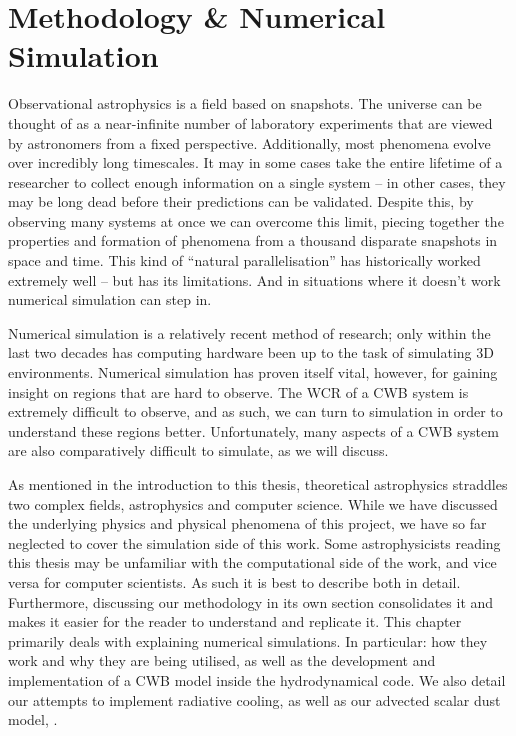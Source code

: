 \chapter{Methodology \& Numerical Simulation}
\label{ch:numsim}

Observational astrophysics is a field based on snapshots.
The universe can be thought of as a near-infinite number of laboratory experiments that are viewed by astronomers from a fixed perspective.
Additionally, most phenomena evolve over incredibly long timescales.
It may in some cases take the entire lifetime of a researcher to collect enough information on a single system -- in other cases, they may be long dead before their predictions can be validated.
Despite this, by observing many systems at once we can overcome this limit, piecing together the properties and formation of phenomena from a thousand disparate snapshots in space and time.
This kind of ``natural parallelisation'' has historically worked extremely well -- but has its limitations.
And in situations where it doesn't work numerical simulation can step in.

Numerical simulation is a relatively recent method of research; only within the last two decades has computing hardware been up to the task of simulating 3D environments.
Numerical simulation has proven itself vital, however, for gaining insight on regions that are hard to observe.
The WCR of a CWB system is extremely difficult to observe, and as such, we can turn to simulation in order to understand these regions better.
Unfortunately, many aspects of a CWB system are also comparatively difficult to simulate, as we will discuss.

As mentioned in the introduction to this thesis, theoretical astrophysics straddles two complex fields, astrophysics and computer science.
While we have discussed the underlying physics and physical phenomena of this project, we have so far neglected to cover the simulation side of this work.
Some astrophysicists reading this thesis may be unfamiliar with the computational side of the work, and vice versa for computer scientists.
As such it is best to describe both in detail.
Furthermore, discussing our methodology in its own section consolidates it and makes it easier for the reader to understand and replicate it.
This chapter primarily deals with explaining numerical simulations.
In particular: how they work and why they are being utilised, as well as the development and implementation of a CWB model inside the \athena{} hydrodynamical code.
We also detail our attempts to implement radiative cooling, as well as our advected scalar dust model, \bidmas.

